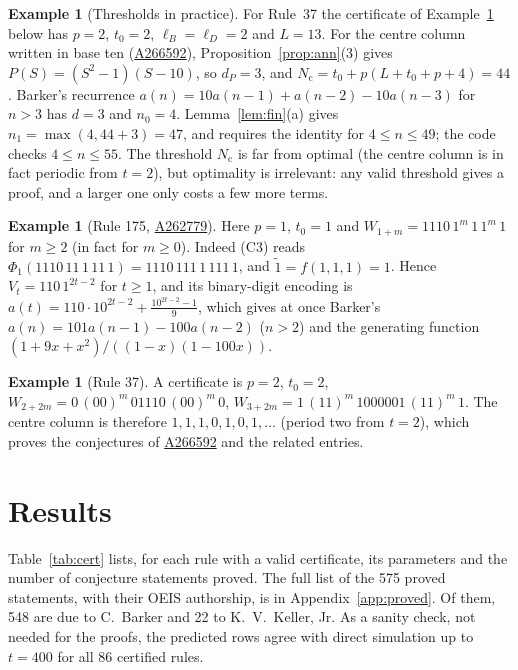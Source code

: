 \documentclass[11pt]{article}
\theoremstyle{definition}
\newtheorem{example}[theorem]{Example}
\theoremstyle{remark}
\newcommand{\oeis}[1]{\href{https://oeis.org/#1}{#1}}
\begin{document}
\begin{example}[Thresholds in practice]
For Rule~37 the certificate of Example~\ref{ex:37} below has $p=2$, $t_0=2$, $\ell_B=\ell_D=2$ and $L=13$. For the centre column written in base ten (\oeis{A266592}), Proposition~\ref{prop:ann}(3) gives $P(S)=(S^2-1)(S-10)$, so $d_P=3$, and $N_{\mathrm c}=t_0+p(L+t_0+p+4)=44$. Barker's recurrence $a(n)=10a(n-1)+a(n-2)-10a(n-3)$ for $n>3$ has $d=3$ and $n_0=4$. Lemma~\ref{lem:fin}(a) gives $n_1=\max(4,44+3)=47$, and requires the identity for $4\le n\le 49$; the code checks $4\le n\le 55$. The threshold $N_{\mathrm c}$ is far from optimal (the centre column is in fact periodic from $t=2$), but optimality is irrelevant: any valid threshold gives a proof, and a larger one only costs a few more terms.
\end{example}

\begin{example}[Rule 175, \oeis{A262779}]
Here $p=1$, $t_0=1$ and $W_{1+m}=1110\,1^m\,1\,1^m\,1$ for $m\ge 2$ (in fact for $m\ge0$). Indeed (C3) reads $\Phi_1(1110\,11\,1\,11\,1)=1110\,111\,1\,111\,1$, and $\widetilde{1}=f(1,1,1)=1$. Hence $V_t=110\,1^{2t-2}$ for $t\ge1$, and its binary-digit encoding is $a(t)=110\cdot10^{2t-2}+\frac{10^{2t-2}-1}{9}$, which gives at once Barker's $a(n)=101a(n-1)-100a(n-2)$ ($n>2$) and the generating function $(1+9x+x^2)/((1-x)(1-100x))$.
\end{example}

\begin{example}[Rule 37]\label{ex:37}
A certificate is $p=2$, $t_0=2$, $W_{2+2m}=0\,(00)^m\,01110\,(00)^m\,0$, $W_{3+2m}=1\,(11)^m\,1000001\,(11)^m\,1$. The centre column is therefore $1,1,1,0,1,0,1,\dots$ (period two from $t=2$), which proves the conjectures of \oeis{A266592} and the related entries.
\end{example}

\section{Results}\label{sec:results}

Table~\ref{tab:cert} lists, for each rule with a valid certificate, its parameters and the number of conjecture statements proved. The full list of the 575 proved statements, with their OEIS authorship, is in Appendix~\ref{app:proved}. Of them, 548 are due to C.~Barker and 22 to K.~V.~Keller, Jr. As a sanity check, not needed for the proofs, the predicted rows agree with direct simulation up to $t=400$ for all 86 certified rules.
\end{document}

